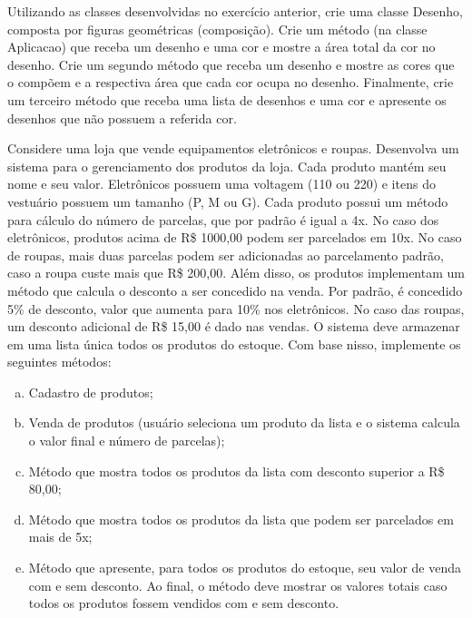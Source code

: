 \begin{exercise}[OperacoesCores]
Utilizando as classes desenvolvidas no exercício anterior, crie uma classe Desenho, composta por figuras geométricas (composição). Crie um método (na classe Aplicacao) que receba um desenho e uma cor e mostre a área total da cor no desenho. Crie um segundo método que receba um desenho e mostre as cores que o compõem e a respectiva área que cada cor ocupa no desenho. Finalmente, crie um terceiro método que receba uma lista de desenhos e uma cor e apresente os desenhos que não possuem a referida cor.
\end{exercise}

\begin{exercise}[Loja]
Considere uma loja que vende equipamentos eletrônicos e roupas. Desenvolva um sistema para o gerenciamento dos produtos da loja. Cada produto mantém seu nome e seu valor. Eletrônicos possuem uma voltagem (110 ou 220) e itens do vestuário possuem um tamanho (P, M ou G). Cada produto possui um método para cálculo do número de parcelas, que por padrão é igual a 4x. No caso dos eletrônicos, produtos acima de R\$ 1000,00 podem ser parcelados em 10x. No caso de roupas, mais duas parcelas podem ser adicionadas ao parcelamento padrão, caso a roupa custe mais que R\$ 200,00. Além disso, os produtos implementam um método que calcula o desconto a ser concedido na venda. Por padrão, é concedido 5\% de desconto, valor que aumenta para 10\% nos eletrônicos. No caso das roupas, um desconto adicional de R\$ 15,00 é dado nas vendas. O sistema deve armazenar em uma lista única todos os produtos do estoque. Com base nisso, implemente os seguintes métodos:

\begin{enumerate}[a)]
\item Cadastro de produtos;
\item Venda de produtos (usuário seleciona um produto da lista e o sistema calcula o valor final e número de parcelas);
\item Método que mostra todos os produtos da lista com desconto superior a R\$ 80,00;
\item Método que mostra todos os produtos da lista que podem ser parcelados em mais de 5x;
\item Método que apresente, para todos os produtos do estoque, seu valor de venda com e sem desconto. Ao final, o método deve mostrar os valores totais caso todos os produtos fossem vendidos com e sem desconto.
\end{enumerate}


\end{exercise}
